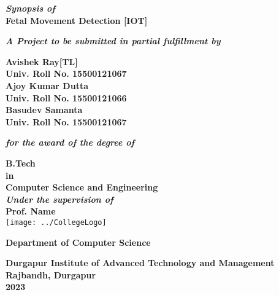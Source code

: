 \documentclass[12pt,a4paper,oneside]{report}
\begin{document}
	\thispagestyle{empty}
	\begin{center}
		{\textbf{\textit{Synopsis of}\\}}
		{\Large\bf{Fetal Movement Detection [IOT]} \\}
		
		
		\vspace{0.3in}
		
		
		{\textbf{\textit  {A Project to be submitted in partial fulfillment by\\}}}
		
		
		
		\vspace{0.4in}
		{\large \bf Avishek Ray[TL]\\Univ. Roll No. 15500121067\\Ajoy Kumar Dutta\\Univ. Roll No. 15500121066\\ Basudev Samanta\\Univ. Roll No. 15500121067\\}
			
		
		\vspace{0.3 in}
		
		{\bf\textit{for the award of the degree of}}
		
		\vspace{0.3 in}
		
		
		{\Large{\bf B.Tech \\ in \\Computer Science and Engineering }\\}
		\vspace{0.3in}
		{\bf\textit{Under the supervision of\\ }}
		{\Large{\bf Prof. Name}\\}		    
		\vspace{0.3in}
		\texttt{[image: ../CollegeLogo]}
		
		
		{\large\bf Department of Computer Science\\}
		
		{\large\bf  Durgapur Institute of Advanced Technology and Management \\}
		{\large\bf Rajbandh, Durgapur \\}
		{\large\bf  2023 }
	\end{center}
	\date{}
	\setcounter{page}{0}
	
\end{document}

